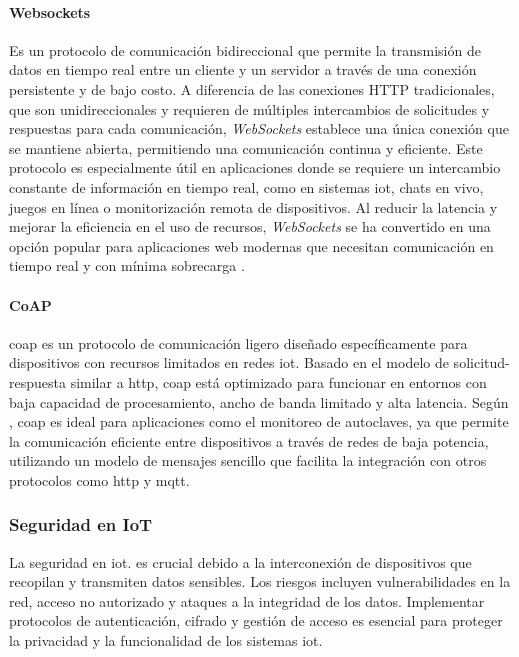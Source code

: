 \paragraph{Websockets}
Es un protocolo de comunicación bidireccional que permite la transmisión de datos en tiempo real entre un cliente y un servidor a través de una conexión persistente y de bajo costo. A diferencia de las conexiones HTTP tradicionales, que son unidireccionales y requieren de múltiples intercambios de solicitudes y respuestas para cada comunicación, \textit{WebSockets} establece una única conexión que se mantiene abierta, permitiendo una comunicación continua y eficiente. Este protocolo es especialmente útil en aplicaciones donde se requiere un intercambio constante de información en tiempo real, como en sistemas \acrshort{iot}, chats en vivo, juegos en línea o monitorización remota de dispositivos. Al reducir la latencia y mejorar la eficiencia en el uso de recursos, \textit{WebSockets} se ha convertido en una opción popular para aplicaciones web modernas que necesitan comunicación en tiempo real y con mínima sobrecarga \citep{Fette2011}.

\paragraph{CoAP}

\acrfull{coap} es un protocolo de comunicación ligero diseñado específicamente para dispositivos con recursos limitados en redes \acrshort{iot}. Basado en el modelo de solicitud-respuesta similar a \acrshort{http}, \acrshort{coap} está optimizado para funcionar en entornos con baja capacidad de procesamiento, ancho de banda limitado y alta latencia. Según \cite{Shelby2014}, \acrshort{coap} es ideal para aplicaciones como el monitoreo de autoclaves, ya que permite la comunicación eficiente entre dispositivos a través de redes de baja potencia, utilizando un modelo de mensajes sencillo que facilita la integración con otros protocolos como \acrshort{http} y \acrshort{mqtt}.

\subsubsection{Seguridad en IoT}
La seguridad en \acrshort{iot}. es crucial debido a la interconexión de dispositivos que recopilan y transmiten datos sensibles. Los riesgos incluyen vulnerabilidades en la red, acceso no autorizado y ataques a la integridad de los datos. Implementar protocolos de autenticación, cifrado y gestión de acceso es esencial para proteger la privacidad y la funcionalidad de los sistemas \acrshort{iot}.


